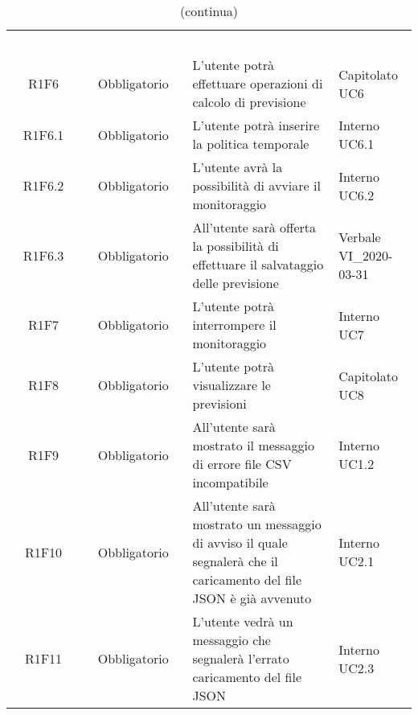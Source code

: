 \begin{table}[H]
\centering\renewcommand{\arraystretch}{1.5}
\caption{(continua)}
\vspace{0.2cm}
\begin{tabular}{ c  c  p{4 cm} C{2.5 cm} }
\textcolor{white}{\textbf{Requisito}} & \textcolor{white}{\textbf{Classificazione}} & 
\textcolor{white}{\textbf{Descrizione}} & \textcolor{white}{\textbf{Fonti}} \\
R1F6 & Obbligatorio & L’utente potrà effettuare operazioni di calcolo di previsione &  Capitolato UC6\\
R1F6.1 & Obbligatorio & L’utente potrà inserire la politica temporale &  Interno UC6.1\\
R1F6.2 & Obbligatorio & L’utente avrà la possibilità di avviare il monitoraggio &  Interno UC6.2\\
R1F6.3 & Obbligatorio & All’utente sarà offerta la possibilità di effettuare il salvataggio delle previsione &  Verbale VI\_2020-03-31\\
R1F7 & Obbligatorio & L’utente potrà interrompere il monitoraggio & Interno UC7\\
R1F8 & Obbligatorio & L’utente potrà visualizzare le previsioni &  Capitolato UC8\\
R1F9 & Obbligatorio & All’utente sarà mostrato il messaggio di errore file CSV incompatibile &  Interno UC1.2\\
R1F10 & Obbligatorio & All’utente sarà mostrato un messaggio di avviso il quale segnalerà che il caricamento del file JSON è già avvenuto &  Interno UC2.1\\
R1F11 & Obbligatorio & L’utente vedrà un messaggio che segnalerà l’errato caricamento del file JSON &  Interno UC2.3\\
\end{tabular}
\end{table}

